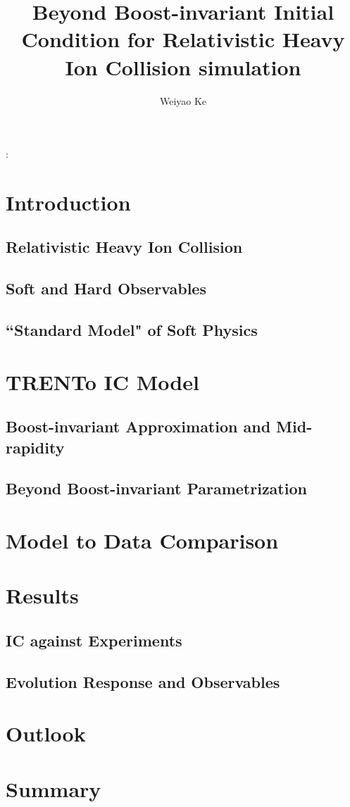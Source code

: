 \documentclass[10pt,a4paper]{article}
\begin{document}
\title{Beyond Boost-invariant Initial Condition for Relativistic Heavy Ion Collision simulation}
\author{Weiyao Ke}
\maketitle

\abstractname{:}

\section{Introduction}
	\subsection{Relativistic Heavy Ion Collision}
	\subsection{Soft and Hard Observables}
	\subsection{``Standard Model" of Soft Physics}

\section{TRENTo IC Model}
	\subsection{Boost-invariant Approximation and Mid-rapidity}
	\subsection{Beyond Boost-invariant Parametrization}

\section{Model to Data Comparison}
	
\section{Results}
	\subsection{IC against Experiments}
	\subsection{Evolution Response and Observables}
\section{Outlook}

\section{Summary}
\end{document}
